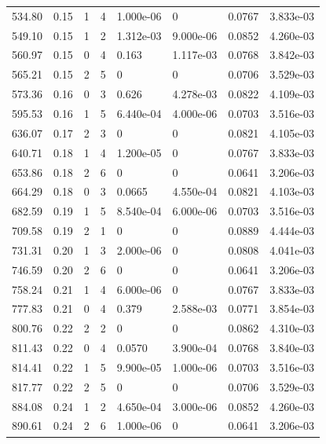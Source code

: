 \documentclass[preview]{standalone}
\begin{document}
{{\begin{tabular}{L{1.2cm}C{1.2cm} C{0.3cm}C{0.5cm} C{1.4cm}C{1.4cm} C{1.4cm}C{1.4cm}}
  534.80  &  0.15  & 1     &  4 &  1.000e-06  & 0  & 0.0767 &  3.833e-03   \\ 
  549.10  &  0.15  & 1     &  2 &  1.312e-03  & 9.000e-06  & 0.0852 &  4.260e-03   \\ 
  560.97  &  0.15  & 0     &  4 &  0.163  & 1.117e-03  & 0.0768 &  3.842e-03   \\ 
  565.21  &  0.15  & 2     &  5 &  0  & 0  & 0.0706 &  3.529e-03   \\ 
  573.36  &  0.16  & 0     &  3 &  0.626  & 4.278e-03  & 0.0822 &  4.109e-03   \\ 
  595.53  &  0.16  & 1     &  5 &  6.440e-04  & 4.000e-06  & 0.0703 &  3.516e-03   \\ 
  636.07  &  0.17  & 2     &  3 &  0  & 0  & 0.0821 &  4.105e-03   \\ 
  640.71  &  0.18  & 1     &  4 &  1.200e-05  & 0  & 0.0767 &  3.833e-03   \\ 
  653.86  &  0.18  & 2     &  6 &  0  & 0  & 0.0641 &  3.206e-03   \\ 
  664.29  &  0.18  & 0     &  3 &  0.0665  & 4.550e-04  & 0.0821 &  4.103e-03   \\ 
  682.59  &  0.19  & 1     &  5 &  8.540e-04  & 6.000e-06  & 0.0703 &  3.516e-03   \\ 
  709.58  &  0.19  & 2     &  1 &  0  & 0  & 0.0889 &  4.444e-03   \\ 
  731.31  &  0.20  & 1     &  3 &  2.000e-06  & 0  & 0.0808 &  4.041e-03   \\ 
  746.59  &  0.20  & 2     &  6 &  0  & 0  & 0.0641 &  3.206e-03   \\ 
  758.24  &  0.21  & 1     &  4 &  6.000e-06  & 0  & 0.0767 &  3.833e-03   \\ 
  777.83  &  0.21  & 0     &  4 &  0.379  & 2.588e-03  & 0.0771 &  3.854e-03   \\ 
  800.76  &  0.22  & 2     &  2 &  0  & 0  & 0.0862 &  4.310e-03   \\ 
  811.43  &  0.22  & 0     &  4 &  0.0570  & 3.900e-04  & 0.0768 &  3.840e-03   \\ 
  814.41  &  0.22  & 1     &  5 &  9.900e-05  & 1.000e-06  & 0.0703 &  3.516e-03   \\ 
  817.77  &  0.22  & 2     &  5 &  0  & 0  & 0.0706 &  3.529e-03   \\ 
  884.08  &  0.24  & 1     &  2 &  4.650e-04  & 3.000e-06  & 0.0852 &  4.260e-03   \\ 
  890.61  &  0.24  & 2     &  6 &  1.000e-06  & 0  & 0.0641 &  3.206e-03   \\ 

\end{tabular}}}
\end{document}

